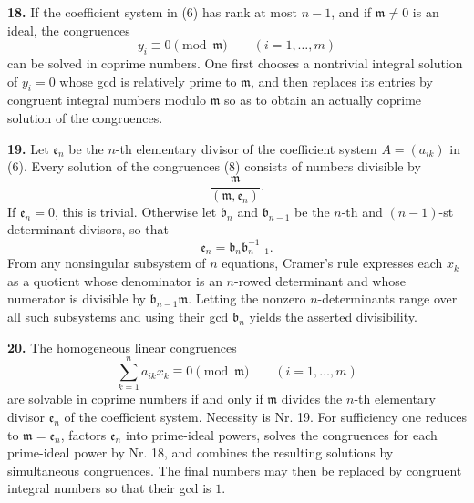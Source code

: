 \documentclass[11pt,a4paper]{article}
\begin{document}
\textbf{18.} If the coefficient system in (6) has rank at most \(n-1\), and if \(\mathfrak m\ne0\) is an ideal, the congruences
\[
 y_i\equiv0\pmod{\mathfrak m}\qquad(i=1,\ldots,m) \tag{8}
\]
can be solved in coprime numbers. One first chooses a nontrivial integral solution of \(y_i=0\) whose gcd is relatively prime to \(\mathfrak m\), and then replaces its entries by congruent integral numbers modulo \(\mathfrak m\) so as to obtain an actually coprime solution of the congruences.

\textbf{19.} Let \(\mathfrak e_n\) be the \(n\)-th elementary divisor of the coefficient system \(A=(a_{ik})\) in (6). Every solution of the congruences (8) consists of numbers divisible by
\[
 \frac{\mathfrak m}{(\mathfrak m,\mathfrak e_n)}.
\]
If \(\mathfrak e_n=0\), this is trivial. Otherwise let \(\mathfrak b_n\) and \(\mathfrak b_{n-1}\) be the \(n\)-th and \((n-1)\)-st determinant divisors, so that
\[
 \mathfrak e_n=\mathfrak b_n\mathfrak b_{n-1}^{-1}.
\]
From any nonsingular subsystem of \(n\) equations, Cramer's rule expresses each \(x_k\) as a quotient whose denominator is an \(n\)-rowed determinant and whose numerator is divisible by \(\mathfrak b_{n-1}\mathfrak m\). Letting the nonzero \(n\)-determinants range over all such subsystems and using their gcd \(\mathfrak b_n\) yields the asserted divisibility.

\textbf{20.} The homogeneous linear congruences
\[
 \sum_{k=1}^{n}a_{ik}x_k\equiv0\pmod{\mathfrak m}\qquad(i=1,\ldots,m) \tag{9}
\]
are solvable in coprime numbers if and only if \(\mathfrak m\) divides the \(n\)-th elementary divisor \(\mathfrak e_n\) of the coefficient system. Necessity is Nr. 19. For sufficiency one reduces to \(\mathfrak m=\mathfrak e_n\), factors \(\mathfrak e_n\) into prime-ideal powers, solves the congruences for each prime-ideal power by Nr. 18, and combines the resulting solutions by simultaneous congruences. The final numbers may then be replaced by congruent integral numbers so that their gcd is \(1\).
\end{document}
